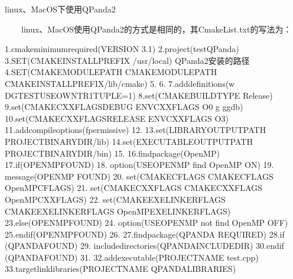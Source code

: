 \documentclass[a4paper,11pt,english]{sphinxmanual}
\begin{document}
\sphinxAtStartPar
linux、MacOS下使用QPanda2

\sphinxAtStartPar
​  linux、MacOS使用QPanda2的方式是相同的，其CmakeList.txt的写法为：

\begin{sphinxVerbatim}[commandchars=\\\{\}]
1.cmake\PYGZus{}minimum\PYGZus{}required(VERSION 3.1)
2.project(testQPanda)
3.SET(CMAKE\PYGZus{}INSTALL\PYGZus{}PREFIX  \PYGZdq{}/usr/local\PYGZdq{}) \PYGZsh{} QPanda2安装的路径
4.SET(CMAKE\PYGZus{}MODULE\PYGZus{}PATH \PYGZdl{}\PYGZob{}CMAKE\PYGZus{}MODULE\PYGZus{}PATH\PYGZcb{} \PYGZdq{}\PYGZdl{}\PYGZob{}CMAKE\PYGZus{}INSTALL\PYGZus{}PREFIX\PYGZcb{}/lib/cmake\PYGZdq{})
5.
6.
7.add\PYGZus{}definitions(\PYGZdq{}\PYGZhy{}w \PYGZhy{}DGTEST\PYGZus{}USE\PYGZus{}OWN\PYGZus{}TR1\PYGZus{}TUPLE=1\PYGZdq{})
8.set(CMAKE\PYGZus{}BUILD\PYGZus{}TYPE \PYGZdq{}Release\PYGZdq{})
9.set(CMAKE\PYGZus{}CXX\PYGZus{}FLAGS\PYGZus{}DEBUG \PYGZdq{}\PYGZdl{}ENV\PYGZob{}CXXFLAGS\PYGZcb{} \PYGZhy{}O0 \PYGZhy{}g \PYGZhy{}ggdb\PYGZdq{})
10.set(CMAKE\PYGZus{}CXX\PYGZus{}FLAGS\PYGZus{}RELEASE \PYGZdq{}\PYGZdl{}ENV\PYGZob{}CXXFLAGS\PYGZcb{} \PYGZhy{}O3\PYGZdq{})
11.add\PYGZus{}compile\PYGZus{}options(\PYGZhy{}fpermissive)
12.
13.set(LIBRARY\PYGZus{}OUTPUT\PYGZus{}PATH \PYGZdl{}\PYGZob{}PROJECT\PYGZus{}BINARY\PYGZus{}DIR\PYGZcb{}/lib)
14.set(EXECUTABLE\PYGZus{}OUTPUT\PYGZus{}PATH \PYGZdl{}\PYGZob{}PROJECT\PYGZus{}BINARY\PYGZus{}DIR\PYGZcb{}/bin)
15.
16.find\PYGZus{}package(OpenMP)
17.if(OPENMP\PYGZus{}FOUND)
18.    option(USE\PYGZus{}OPENMP \PYGZdq{}find OpenMP\PYGZdq{} ON)
19.    message(\PYGZdq{}OPENMP FOUND\PYGZdq{})
20.    set(CMAKE\PYGZus{}C\PYGZus{}FLAGS \PYGZdq{}\PYGZdl{}\PYGZob{}CMAKE\PYGZus{}C\PYGZus{}FLAGS\PYGZcb{} \PYGZdl{}\PYGZob{}OpenMP\PYGZus{}C\PYGZus{}FLAGS\PYGZcb{}\PYGZdq{})
21.    set(CMAKE\PYGZus{}CXX\PYGZus{}FLAGS \PYGZdq{}\PYGZdl{}\PYGZob{}CMAKE\PYGZus{}CXX\PYGZus{}FLAGS\PYGZcb{} \PYGZdl{}\PYGZob{}OpenMP\PYGZus{}CXX\PYGZus{}FLAGS\PYGZcb{}\PYGZdq{})
22.    set(CMAKE\PYGZus{}EXE\PYGZus{}LINKER\PYGZus{}FLAGS \PYGZdq{}\PYGZdl{}\PYGZob{}CMAKE\PYGZus{}EXE\PYGZus{}LINKER\PYGZus{}FLAGS\PYGZcb{} \PYGZdl{}\PYGZob{}OpenMP\PYGZus{}EXE\PYGZus{}LINKER\PYGZus{}FLAGS\PYGZcb{}\PYGZdq{})
23.else(OPENMP\PYGZus{}FOUND)
24.    option(USE\PYGZus{}OPENMP \PYGZdq{}not find OpenMP\PYGZdq{} OFF)
25.endif(OPENMP\PYGZus{}FOUND)
26.
27.find\PYGZus{}package(QPANDA REQUIRED)
28.if (QPANDA\PYGZus{}FOUND)
29.    include\PYGZus{}directories(\PYGZdl{}\PYGZob{}QPANDA\PYGZus{}INCLUDE\PYGZus{}DIR\PYGZcb{})
30.endif (QPANDA\PYGZus{}FOUND)
31.
32.add\PYGZus{}executable(\PYGZdl{}\PYGZob{}PROJECT\PYGZus{}NAME\PYGZcb{} test.cpp)
33.target\PYGZus{}link\PYGZus{}libraries(\PYGZdl{}\PYGZob{}PROJECT\PYGZus{}NAME\PYGZcb{} \PYGZdl{}\PYGZob{}QPANDA\PYGZus{}LIBRARIES\PYGZcb{})
\end{sphinxVerbatim}
\end{document}
